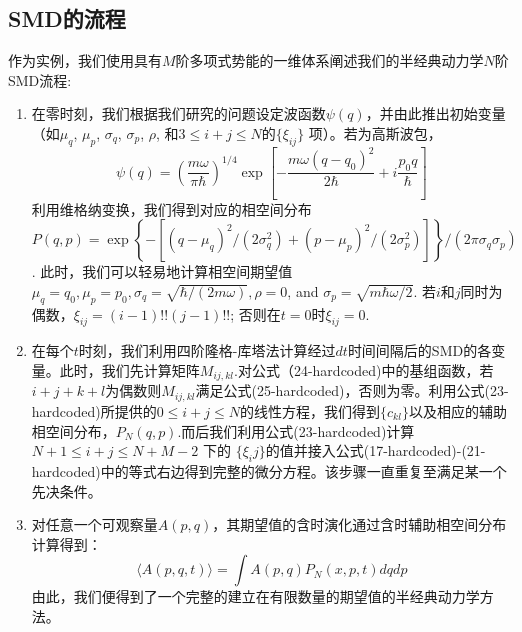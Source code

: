\subsection{SMD的流程}
作为实例，我们使用具有$M$阶多项式势能的一维体系阐述我们的半经典动力学$N$阶SMD流程:
\begin{enumerate}
	\item 在零时刻，我们根据我们研究的问题设定波函数$\psi(q)$，并由此推出初始变量（如$\mu_q$, $\mu_p$, $\sigma_q$, $\sigma_p$, $\rho$, 和$3\leq i+j \leq N$的$\{\xi_{ij}\}$ 项）。若为高斯波包，
	\begin{equation}
		\psi(q)=\left(\frac{m \omega}{\pi \hbar}\right)^{1 / 4} \exp \left[-\frac{m \omega\left(q-q_{0}\right)^{2}}{2 \hbar}+i \frac{p_{0} q}{\hbar}\right]
	\end{equation}
	利用维格纳变换，我们得到对应的相空间分布$P(q,p) = \exp \left\{-\left[\left(q-\mu_{q}\right)^{2} /\left(2 \sigma_{q}^{2}\right)+\left(p-\mu_{p}\right)^{2} /\left(2 \sigma_{p}^{2}\right)\right]\right\} / (2\pi \sigma_q \sigma_p)$. 此时，我们可以轻易地计算相空间期望值$\mu_{q}=q_{0}, \mu_{p}=p_{0}, \sigma_{q}=\sqrt{\hbar /(2 m \omega)},\rho=0$, and $\sigma_p = \sqrt{m\hbar \omega /2 }$. 若$i$和$j$同时为偶数，$\xi_{ij} = (i-1)!!(j-1)!!$; 否则在$t=0$时$\xi_{ij} = 0$.
	\item 在每个$t$时刻，我们利用四阶隆格-库塔法计算经过$dt$时间间隔后的SMD的各变量。此时，我们先计算矩阵$M_{i j, k l}$.对公式（24-hardcoded)中的基组函数，若$i+j+k+l$为偶数则$M_{ij,kl}$满足公式(25-hardcoded)，否则为零。利用公式(23-hardcoded)所提供的$0\leq i + j \leq N$的线性方程，我们得到$\{c_{kl}\}$以及相应的辅助相空间分布，$P_N(q,p)$.而后我们利用公式(23-hardcoded)计算$N+1\leq i+j \leq N+M-2$ 下的 $\{\xi_ij\}$的值并接入公式(17-hardcoded)-(21-hardcoded)中的等式右边得到完整的微分方程。该步骤一直重复至满足某一个先决条件。
	\item 对任意一个可观察量$A(p,q)$，其期望值的含时演化通过含时辅助相空间分布计算得到：
	\begin{equation}
		\langle A(p, q, t)\rangle=\int A(p, q) P_{N}(x, p, t) d q d p
	\end{equation}
	由此，我们便得到了一个完整的建立在有限数量的期望值的半经典动力学方法。
\end{enumerate}
